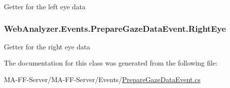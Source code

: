 Getter for the left eye data 

\hypertarget{class_web_analyzer_1_1_events_1_1_prepare_gaze_data_event_a1ceb216d55fdabbf5372f1a600f3ecac}{}
\subsubsection[{Right\+Eye}]{ Web\+Analyzer.\+Events.\+Prepare\+Gaze\+Data\+Event.\+Right\+Eye\hspace{0.3cm}{\ttfamily [get]}}\label{class_web_analyzer_1_1_events_1_1_prepare_gaze_data_event_a1ceb216d55fdabbf5372f1a600f3ecac}


Getter for the right eye data 



The documentation for this class was generated from the following file\+:\begin{DoxyCompactItemize}
\item 
M\+A-\/\+F\+F-\/\+Server/\+M\+A-\/\+F\+F-\/\+Server/\+Events/\hyperlink{_prepare_gaze_data_event_8cs}{Prepare\+Gaze\+Data\+Event.\+cs}\end{DoxyCompactItemize}
